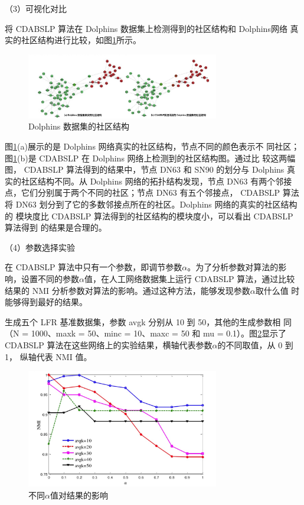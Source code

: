 （3）可视化对比

将 CDABSLP 算法在 Dolphins 数据集上检测得到的社区结构和 Dolphins网络
真实的社区结构进行比较，如图\ref{fig:Dolphins}所示。

\begin{figure}
  \centering
  \includegraphics[width=0.75\textwidth]{figures/Dolphins}
  \caption{Dolphins 数据集的社区结构}\label{fig:Dolphins}
\end{figure}

图\ref{fig:Dolphins}(a)展示的是 Dolphins 网络真实的社区结构，节点不同的颜色表示不
同社区；图\ref{fig:Dolphins}(b)是 CDABSLP 在 Dolphins 网络上检测到的社区结构图。通过比
较这两幅图， CDABSLP 算法得到的结果中，节点 DN63 和 SN90 的划分与 Dolphins
真实的社区结构不同。从 Dolphins 网络的拓扑结构发现，节点 DN63 有两个邻接
点，它们分别属于两个不同的社区；节点 DN63 有五个邻接点， CDABSLP 算法将
DN63 划分到了它的多数邻接点所在的社区。Dolphins 网络的真实的社区结构的
模块度比 CDABSLP 算法得到的社区结构的模块度小，可以看出 CDABSLP 算法得到
的结果是合理的。

（4）参数选择实验

在 CDABSLP 算法中只有一个参数，即调节参数$\alpha$。为了分析参数对算法的影
响，设置不同的参数$\alpha$值，在人工网络数据集上运行 CDABSLP 算法，通过比较
结果的 NMI 分析参数对算法的影响。通过这种方法，能够发现参数$\alpha$取什么值
时能够得到最好的结果。

生成五个 LFR 基准数据集，参数 avgk 分别从 10 到 50，其他的生成参数相
同（N = 1000、maxk = 50、minc = 10、maxc = 50 和 mu = 0.1）。图\ref{fig:alpha}显示了
CDABSLP 算法在这些网络上的实验结果，横轴代表参数$\alpha$的不同取值，从 0 到 1，
纵轴代表 NMI 值。

\begin{figure}
  \centering
  \includegraphics[width=0.75\textwidth]{figures/alpha}
  \caption{不同$\alpha$值对结果的影响}\label{fig:alpha}
\end{figure}

